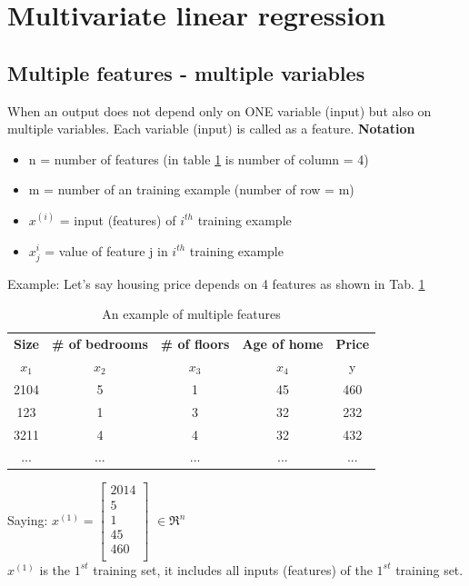 \section{Multivariate linear regression}
\subsection{Multiple features - multiple variables}
When an output does not depend only on ONE variable (input) but also on multiple variables. Each variable (input) is called as a feature.
\textbf{Notation}
\begin{itemize}
	\item n = number of features  (in table \ref{tab:ex_multiple_features} is number of column = 4)
	\item m = number of an training example (number of row = m)
	\item $x^{(i)}$ = input (features) of $i^{th}$ training example
	\item $x^{i}_j$ = value of feature j in $i^{th}$ training example
\end{itemize}

Example: Let's say housing price depends on 4 features as shown in Tab. \ref{tab:ex_multiple_features}
\begin{table}[h]
	\centering
	\begin{tabular}{|c|c|c|c|c|}
		\toprule 
		\textbf{Size} & \textbf{\# of bedrooms} & \textbf{\# of floors} & \textbf{Age of home} & \textbf{Price} \\
		 $x_1$ &$x_2$& $x_3$ & $x_4$ & y  \\
		\midrule 
		2104 	& 5 	& 1 & 45 & 460 \\
		123 	 & 1 	 & 3 & 32 & 232 \\
		3211 	 & 4  	& 4 & 32 & 432 \\
		...  & ... & ... & ... & ... \\
		\bottomrule
	\end{tabular}
\caption{An example of multiple features}
\label{tab:ex_multiple_features}
\end{table}

Saying: $x^{(1)} = \begin{bmatrix}
2014 \\5 \\ 1\\ 45 \\ 460 \\
\end{bmatrix}$  $\in \Re^{n}$ \\
$x^{(1)}$ is the $1^{st}$ training set, it includes all inputs (features) of the $1^{st}$ training set.\\

